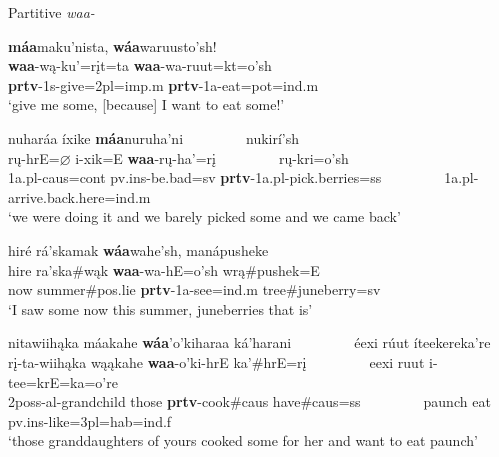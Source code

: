 \begin{exe}

\item\label{ExWAApart} Partitive \textit{waa-}

	\begin{xlist}
	
	\item \glll \textbf{máa}maku'nista, \textbf{wáa}waruusto'sh!\\
	\textbf{waa}-wą-ku'=rįt=ta \textbf{waa}-wa-ruut=kt=o'sh\\
	\textbf{prtv}-1s-\textnormal{give}=2pl=imp.m \textbf{prtv}-1a-\textnormal{eat}=pot=ind.m\\
	\glt `give me some, [because] I want to eat some!' \citep[15]{hollow1973a}
	
	\item \glll nuharáa íxike \textbf{máa}nuruha'ni ~ ~ ~ ~ ~ nukirí'sh\\
	rų-hrE=$\varnothing$ i-xik=E \textbf{waa}-rų-ha'=rį ~ ~ ~ ~ ~ rų-kri=o'sh\\
	1a.pl-caus=cont pv.ins-\textnormal{be.bad}=sv \textbf{prtv}-1a.pl-\textnormal{pick.berries}=ss ~ ~ ~ ~ ~ 1a.pl-\textnormal{arrive.back.here}=ind.m\\
	\glt `we were doing it and we barely picked some and we came back' \citep[52]{hollow1973a}
	
	\item \glll hiré rá'skamak \textbf{wáa}wahe'sh, manápusheke\\
	hire ra'ska\#wąk \textbf{waa}-wa-hE=o'sh wrą\#pushek=E\\
	\textnormal{now} \textnormal{summer}\#pos.lie \textbf{prtv}-1a-\textnormal{see}=ind.m \textnormal{tree}\#\textnormal{juneberry}=sv\\
	\glt `I saw some now this summer, juneberries that is' \citep[52]{hollow1973a}
	
	\item \glll nitawiihąka máakahe \textbf{wáa}'o'kiharaa ká'harani ~ ~ ~ ~ ~ éexi rúut íteekereka're\\
	rį-ta-wiihąka wąąkahe \textbf{waa}-o'ki-hrE ka'\#hrE=rį ~ ~ ~ ~ ~  eexi ruut i-tee=krE=ka=o're\\
	2poss-al-\textnormal{grandchild} \textnormal{those} \textbf{prtv}-\textnormal{cook}\#caus \textnormal{have}\#caus=ss ~ ~ ~ ~ ~ \textnormal{paunch} \textnormal{eat} pv.ins-\textnormal{like}=3pl=hab=ind.f\\
	\glt `those granddaughters of yours cooked some for her and want to eat paunch' \citep[72]{hollow1973a}
	

\end{xlist}
\end{exe}
